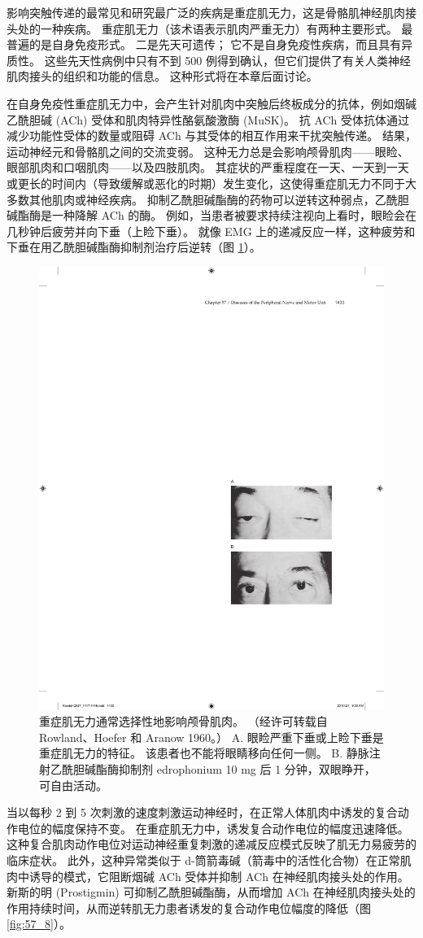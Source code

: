 影响突触传递的最常见和研究最广泛的疾病是重症肌无力，这是骨骼肌神经肌肉接头处的一种疾病。
重症肌无力（该术语表示肌肉严重无力）有两种主要形式。
最普遍的是自身免疫形式。
二是先天可遗传；
它不是自身免疫性疾病，而且具有异质性。
这些先天性病例中只有不到 500 例得到确认，但它们提供了有关人类神经肌肉接头的组织和功能的信息。
这种形式将在本章后面讨论。


在自身免疫性重症肌无力中，会产生针对肌肉中突触后终板成分的抗体，例如烟碱乙酰胆碱 (ACh) 受体和肌肉特异性酪氨酸激酶 (MuSK)。
抗 ACh 受体抗体通过减少功能性受体的数量或阻碍 ACh 与其受体的相互作用来干扰突触传递。
结果，运动神经元和骨骼肌之间的交流变弱。
这种无力总是会影响颅骨肌肉——眼睑、眼部肌肉和口咽肌肉——以及四肢肌肉。
其症状的严重程度在一天、一天到一天或更长的时间内（导致缓解或恶化的时期）发生变化，这使得重症肌无力不同于大多数其他肌肉或神经疾病。
抑制乙酰胆碱酯酶的药物可以逆转这种弱点，乙酰胆碱酯酶是一种降解 ACh 的酶。
例如，当患者被要求持续注视向上看时，眼睑会在几秒钟后疲劳并向下垂（上睑下垂）。
就像 EMG 上的递减反应一样，这种疲劳和下垂在用乙酰胆碱酯酶抑制剂治疗后逆转（图 \ref{fig:57_7}）。


\begin{figure}[htbp]
	\centering
	\includegraphics[width=0.45\linewidth]{chap57/fig_57_7}
	\caption{重症肌无力通常选择性地影响颅骨肌肉。 （经许可转载自 Rowland、Hoefer 和 Aranow 1960。） A. 眼睑严重下垂或上睑下垂是重症肌无力的特征。 该患者也不能将眼睛移向任何一侧。 B. 静脉注射乙酰胆碱酯酶抑制剂 edrophonium 10 mg 后 1 分钟，双眼睁开，可自由活动。}
	\label{fig:57_7}
\end{figure}


当以每秒 2 到 5 次刺激的速度刺激运动神经时，在正常人体肌肉中诱发的复合动作电位的幅度保持不变。
在重症肌无力中，诱发复合动作电位的幅度迅速降低。
这种复合肌肉动作电位对运动神经重复刺激的递减反应模式反映了肌无力易疲劳的临床症状。
此外，这种异常类似于 d-筒箭毒碱（箭毒中的活性化合物）在正常肌肉中诱导的模式，它阻断烟碱 ACh 受体并抑制 ACh 在神经肌肉接头处的作用。
新斯的明 (Prostigmin) 可抑制乙酰胆碱酯酶，从而增加 ACh 在神经肌肉接头处的作用持续时间，从而逆转肌无力患者诱发的复合动作电位幅度的降低（图 \ref{fig:57_8}）。


